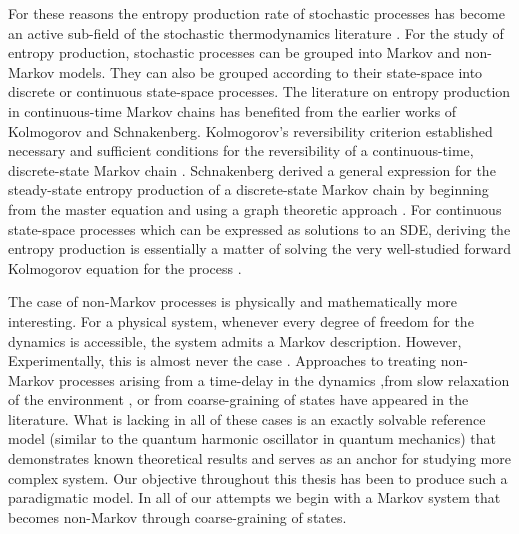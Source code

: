 For these reasons the entropy production rate of stochastic processes has become an active sub-field of the stochastic thermodynamics literature \cite{nardini2017entropy,van2022thermodynamic,cocconi2022scaling,frydel2022intuitive}. For the study of entropy production, stochastic processes can be grouped into Markov and non-Markov models. They can also be grouped according to their state-space into discrete or continuous state-space processes. The literature on entropy production in continuous-time Markov chains has benefited from the earlier works of Kolmogorov and Schnakenberg. Kolmogorov's reversibility criterion established necessary and sufficient conditions for the reversibility of a  continuous-time, discrete-state Markov chain \cite[pp. 21-24]{kelly2011reversibility}. Schnakenberg derived a general expression for the steady-state entropy production of a discrete-state Markov chain by beginning from the master equation and using a graph theoretic approach \cite{schnakenberg1976network}. For continuous state-space processes which can be expressed as solutions to an SDE, deriving the entropy production is essentially a matter of solving the very well-studied forward Kolmogorov equation for the process \cite{cocconi2020entropy,garcia2021run}.

The case of non-Markov processes is physically and mathematically more interesting. For a physical system, whenever every degree of freedom for the dynamics is accessible, the system admits a Markov description. However, Experimentally, this is almost never the case \cite{gardiner1985handbook}. Approaches to treating non-Markov processes arising from a time-delay in the dynamics \cite{loos2019heat} ,from slow relaxation of the environment \cite{kutvonen2015entropy}, or from coarse-graining of states \cite{busiello2019entropy} have appeared in the literature. What is lacking in all of these cases is an exactly solvable reference model (similar to the quantum harmonic oscillator in quantum mechanics) that demonstrates known theoretical results and serves as an anchor for studying more complex system. Our objective throughout this thesis has been to produce such a paradigmatic model. In all of our attempts we begin with a Markov system that becomes non-Markov through coarse-graining of states. 

